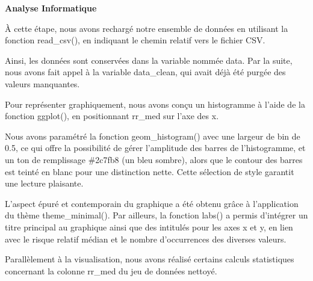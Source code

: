 \documentclass[
]{article}
\newenvironment{Shaded}{\begin{snugshade}}{\end{snugshade}}
\newcommand{\AttributeTok}[1]{\textcolor[rgb]{0.13,0.29,0.53}{#1}}
\newcommand{\CommentTok}[1]{\textcolor[rgb]{0.56,0.35,0.01}{\textit{#1}}}
\newcommand{\ConstantTok}[1]{\textcolor[rgb]{0.56,0.35,0.01}{#1}}
\newcommand{\FunctionTok}[1]{\textcolor[rgb]{0.13,0.29,0.53}{\textbf{#1}}}
\newcommand{\NormalTok}[1]{#1}
\newcommand{\OtherTok}[1]{\textcolor[rgb]{0.56,0.35,0.01}{#1}}
\newcommand{\SpecialCharTok}[1]{\textcolor[rgb]{0.81,0.36,0.00}{\textbf{#1}}}
\begin{document}
\begin{Shaded}
\end{Shaded}

\textbf{Analyse Informatique}

À cette étape, nous avons rechargé notre ensemble de données en
utilisant la fonction read\_csv(), en indiquant le chemin relatif vers
le fichier CSV.

Ainsi, les données sont conservées dans la variable nommée data. Par la
suite, nous avons fait appel à la variable data\_clean, qui avait déjà
été purgée des valeurs manquantes.

Pour représenter graphiquement, nous avons conçu un histogramme à l'aide
de la fonction ggplot(), en positionnant rr\_med sur l'axe des x.

Nous avons paramétré la fonction geom\_histogram() avec une largeur de
bin de 0.5, ce qui offre la possibilité de gérer l'amplitude des barres
de l'histogramme, et un ton de remplissage \#2c7fb8 (un bleu sombre),
alors que le contour des barres est teinté en blanc pour une distinction
nette. Cette sélection de style garantit une lecture plaisante.

L'aspect épuré et contemporain du graphique a été obtenu grâce à
l'application du thème theme\_minimal(). Par ailleurs, la fonction
labs() a permis d'intégrer un titre principal au graphique ainsi que des
intitulés pour les axes x et y, en lien avec le risque relatif médian et
le nombre d'occurrences des diverses valeurs.

Parallèlement à la visualisation, nous avons réalisé certains calculs
statistiques concernant la colonne rr\_med du jeu de données nettoyé.
\end{document}
